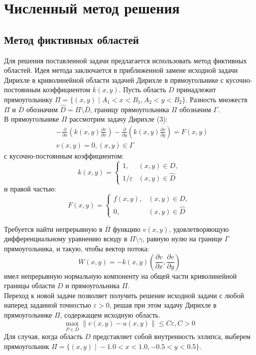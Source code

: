\documentclass[oneside,final,14pt]{extreport}
\begin{document}
\section{Численный метод решения}
\subsection{Метод фиктивных областей}
\noindent
Для решения поставленной задачи предлагается использовать метод
фиктивных областей. Идея метода заключается в приближенной замене
исходной задачи Дирихле в криволинейной области
задачей Дирихле в прямоугольнике с кусочно-постоянным коэффициентом
\( k(x, y) \). Пусть область \( D \) принадлежит прямоугольнику
\( \Pi = \{(x,y) \; | \; A_1 < x < B_1, A_2 < y < B_2 \} \). Разность
множеств \( \Pi \) и \( \bar D \) обозначим \( \hat D = \Pi \setminus \bar D \),
границу прямоугольника \( \Pi \) обозначим \( \Gamma \).
\\В прямоугольнике \( \Pi \) рассмотрим задачу Дирихле (3):
\[ \begin{aligned}
  & -\frac{\partial}{\partial x}(k(x,y)\frac{\partial v}{\partial x})
  - \frac{\partial}{\partial y}(k(x,y)\frac{\partial v}{\partial y}) = F(x,y)\\
  & v(x, y) = 0, (x, y) \in \Gamma
\end{aligned} \]
с кусочно-постоянным коэффициентом:
\[ k(x, y) = 
\begin{cases}
    1,   & (x, y) \in D, \\
    1 / \varepsilon & (x, y) \in \hat D
\end{cases} \]
и правой частью:
\[ F(x, y) = 
\begin{cases}
    f(x, y),   & (x, y) \in D, \\
    0, & (x, y) \in \hat D
\end{cases} \]

Требуется найти непрерывную в \( \bar \Pi \) функцию \( v(x, y) \),
удовлетворяющую дифференциальному уравнению всюду в \( \Pi \setminus \gamma \),
равную нулю на границе \( \Gamma \) прямоугольника, и такую, чтобы вектор
потока:
\[ W(x, y) = -k(x, y)
    (\frac{\partial v}{\partial x}, \frac{\partial v}{\partial y})
\]
имел непрерывную нормальную компоненту на общей части криволинейной границы
области \( D \) и прямоугольника \( \Pi \). \\
Переход к новой задаче позволяет получить решение исходной задачи
с любой наперед заданной точностью \( \varepsilon > 0 \), решая при этом
задачу Дирихле в прямоугольнике \( \Pi \), содержащем исходную область.
\[ \max_{P \in \bar D} \|v(x, y) - u(x, y) \| \le C \varepsilon, C > 0 \]
Для случая, когда область \( D \) представляет собой внутренность эллипса,
выберем прямоугольник
\( \Pi = \{(x,y) \; | \; -1.0 < x < 1.0, -0.5 < y < 0.5 \} \).
\end{document}
